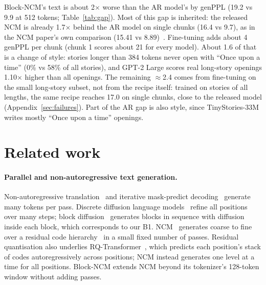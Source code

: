 \documentclass[10pt,twocolumn]{article}
\begin{document}
Block-NCM's text is about 2$\times$ worse than the AR model's by genPPL (19.2 vs 9.9 at 512 tokens;
Table~\ref{tab:gap}). Most of this gap is inherited: the released NCM is already 1.7$\times$ behind the AR model on
single chunks (16.4 vs 9.7), as in the NCM paper's own comparison (15.41 vs 8.89)~\cite{ncm}. Fine-tuning adds about
4 genPPL per chunk (chunk 1 scores about 21 for every model). About 1.6 of that is a change of style: stories longer
than 384 tokens never open with ``Once upon a time'' (0\% vs 58\% of all stories), and GPT-2 Large scores real
long-story openings 1.10$\times$ higher than all openings. The remaining $\approx$2.4 comes from fine-tuning on the
small long-story subset, not from the recipe itself: trained on stories of all lengths, the same recipe reaches 17.0
on single chunks, close to the released model (Appendix~\ref{sec:failures}). Part of the AR gap is also style, since
TinyStories-33M writes mostly ``Once upon a time'' openings.

\section{Related work}

\paragraph{Parallel and non-autoregressive text generation.} Non-autoregressive translation~\cite{gu2018nat} and
iterative mask-predict decoding~\cite{maskpredict, maskgit} generate many tokens per pass. Discrete diffusion language
models~\cite{sedd, mdlm} refine all positions over many steps; block diffusion~\cite{bd3lm} generates blocks in
sequence with diffusion inside each block, which corresponds to our B1. NCM~\cite{ncm} generates coarse to fine over
a residual code hierarchy~\cite{vqvae, soundstream} in a small fixed number of passes. Residual quantisation also
underlies RQ-Transformer~\cite{rqtransformer}, which predicts each position's stack of codes autoregressively
across positions; NCM instead generates one level at a time for all positions. Block-NCM extends NCM beyond its
tokenizer's 128-token window without adding passes.
\end{document}
